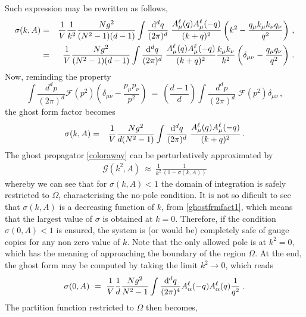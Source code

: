 Such expression may be rewritten as follows,
\begin{eqnarray}
\sigma(k,A) &=& \frac{1}{V}\frac{1}{k^2} \frac{Ng^2}{(N^2 - 1)(d-1)} 
\int\frac{ \mathrm{d}^d q}{(2 \pi)^d}\;
\frac{A_\mu^\ell(q) A_\mu^{\ell}(-q)}{(k+q)^2}
\left(k^{2}  - \frac{q_{\mu}k_\mu k_\nu q_{\nu} }{q^{2}} 
\right) 
\,,
\nonumber \\
&=&
\frac{1}{V} \frac{Ng^2}{(N^2 - 1)(d-1)} 
\int\frac{ \mathrm{d}^d q}{(2 \pi)^d}\;
\frac{A_\mu^\ell(q) A_\mu^{\ell}(-q)}{(k+q)^2}
\frac{k_{\mu}k_{\nu}}{k^2}
\left(\delta_{\mu\nu} - \frac{q_{\mu}q_{\nu} }{q^{2}} 
\right)  \,.
\label{1ghostformfacto3}
\end{eqnarray}
Now, reminding the property
\begin{equation}
\int \frac{d^{d}p}{(2\pi )^{d}}
\mathcal{F}(p^2) \left( \delta _{\mu \nu }-\frac{p_{\mu }p_{\nu }}{p^{2}}\right)  
~=~ \left( \frac{d-1}{d} \right)  
\int \frac{d^{d}p}{(2\pi )^{d}}\;\mathcal{F}(p^2) \delta_{\mu\nu} \,,
\label{a}
\end{equation}
the ghost form factor becomes
\begin{eqnarray}
\sigma(k,A) &=&
\frac{1}{V} \frac{Ng^2}{d(N^2 - 1)} 
\int\frac{ \mathrm{d}^d q}{(2 \pi)^d}\;
\frac{A_\mu^\ell(q) A_\mu^{\ell}(-q)}{(k+q)^2}  \,.
\label{ghostfrmfact1}
\end{eqnarray}
The ghost propagator \eqref{coloraway} can be perturbatively approximated by
\begin{eqnarray}
\mathcal G (k^2, A) ~\approx~  \frac{1}{k^2}\frac{1}{( 1 - \sigma(k, A) )}
\label{ghstprop00}
\end{eqnarray}
whereby we can see that for $ \sigma(k, A) < 1$ the domain of integration is safely restricted
to $\Omega$, characterising the no-pole condition. It is not so dificult to see that 
$\sigma(k,A)$ is a
decreasing function of $k$, from \eqref{ghostfrmfact1}, which means that the largest value of
$\sigma$ is obtained at $k=0$. Therefore, if the condition $ \sigma(0, A) < 1$ is ensured, the
system is (or would be) completely safe of gauge copies for any non zero value of $k$. Note
that the only allowed pole is at $k^2=0$, which has the meaning of approaching the boundary of
the region $\Omega$. At the end, the ghost form may be computed by taking the limit 
$k^{2} \to 0$, which reads
\begin{eqnarray}
\sigma(0,A) ~=~
\frac{1}{V} \frac{1}{d} \frac{Ng^2}{N^2 - 1} \int\frac{ \mathrm{d}^d q}{(2 \pi)^4} A_\alpha^\ell(-q) A_\alpha^{\ell} (q) \frac{ 1 }{q^2}\;.
\label{nopole}
\end{eqnarray}
The partition function restricted to $\Omega$ then becomes,

